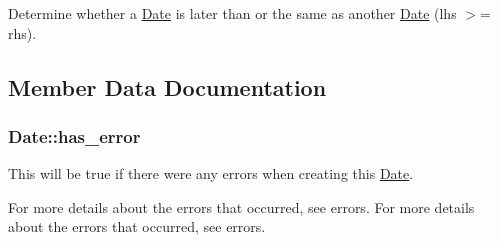 Determine whether a \hyperlink{structDate}{Date} is later than or the same as another \hyperlink{structDate}{Date} (lhs $>$= rhs). 



\subsection{Member Data Documentation}
\hypertarget{structDate_a4f417d9dd4cd9fd081aff88f9b13931b}{
\subsubsection[{has\-\_\-error}]{ Date\-::has\-\_\-error}}\label{structDate_a4f417d9dd4cd9fd081aff88f9b13931b}


This will be true if there were any errors when creating this \hyperlink{structDate}{Date}. 

For more details about the errors that occurred, see {\ttfamily errors}. For more details about the errors that occurred, see {\ttfamily errors}.

